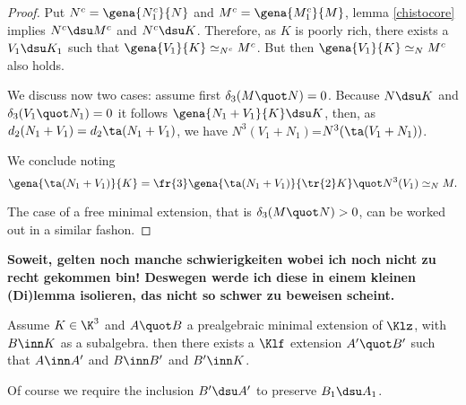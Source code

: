 \begin{proof}
Put $N^{c}=\gena{N^{c}_{1}}{N}$ and $M^{c}=\gena{M^{c}_{1}}{M}$,
lemma \ref{chistocore} implies $N^{c}\dsu M^{c}$ and $N^{c}\dsu K$.
Therefore, as $K$ is poorly rich, there exists a $V_{1}\dsu K_{1}$ such that
$\gena{V_{1}}{K}\simeq_{N^{c}}M^{c}$. But then $\gena{V_{1}}{K}\simeq_{N}M^{c}$ also holds.

We discuss now two cases: assume first $\delta_{3}(M\quot N)=0$. Because $N\dsu K$ and $\delta_{3}(V_{1}\quot N_{1})=0$ it follows $\gena{N_{1}+V_{1}}{K}\dsu K$, then, as $d_{2}(N_{1}+V_{1})=
d_{2}\ta(N_{1}+V_{1})$, we have  $N^{3}(V_{1}+N_{1})$=$N^{3}(\ta(V_{1}+N_{1}))$.

We conclude noting
$$\gena{\ta(N_{1}+V_{1})}{K}=\fr{3}\gena{\ta(N_{1}+V_{1})}{\tr{2}K}\quot N^{3}(V_{1})\simeq_{N}M.$$

The case of a free minimal extension, that is $\delta_{3}(M\quot N)>0$, can be worked
out in a similar fashon.



\end{proof}

\medskip
{\bf Soweit, gelten noch manche schwierigkeiten wobei ich noch nicht zu recht gekommen bin!
Deswegen werde ich diese in einem kleinen (Di)lemma isolieren, das nicht so schwer zu beweisen
scheint.}
\begin{lem}\label{dilemma}
Assume $K\in\K^{3}$ and $A\quot B$ a prealgebraic minimal extension of $\Klz$, with $B \inn K$
as a subalgebra. then there exists a $\Klf$ extension $A^{\prime}\quot B^{\prime}$ such that
$A\inn A^{\prime}$ and $B\inn B^{\prime}$ and $B^{\prime}\inn K$.

Of course we require the inclusion $B^{\prime}\dsu A^{\prime}$ to preserve $B_{1}\dsu A_{1}$.
\end{lem}

